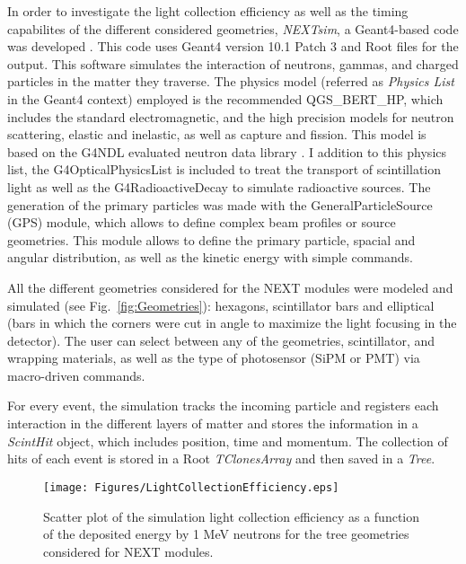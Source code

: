 In order to investigate the light collection efficiency as well as the timing capabilites of the different considered geometries, \emph{NEXTsim}, a {\sc Geant4}-based code was developed \cite{AGOSTINELLI2003250,ALLISON2016186}. This code uses  {\sc Geant4} version 10.1 Patch 3 and {\sc Root} files for the output.
This software simulates the interaction of neutrons, gammas, and charged particles in the matter they traverse. The  physics model (referred as \emph{Physics List} in the {\sc Geant4} context) employed is the recommended QGS\_BERT\_HP, which includes the standard electromagnetic, and the high precision models for neutron scattering, elastic and inelastic, as well as capture and fission.  This model is based on the G4NDL evaluated neutron data library \cite{Apostolakis2009}. I addition to this physics list, the G4OpticalPhysicsList is included to treat the transport of scintillation light as well as the G4RadioactiveDecay to simulate radioactive sources. The generation of the primary particles  was made with the GeneralParticleSource (GPS) module, which allows to define complex beam profiles or source geometries. This module allows to define the primary particle,  spacial and angular distribution, as well as the kinetic energy with simple commands.
 
 All the different geometries considered for the NEXT modules were modeled and simulated (see  Fig.~\ref{fig:Geometries}): hexagons, scintillator bars and elliptical (bars in which the corners were cut in angle to maximize the light focusing in the detector). The user can select between any of the geometries, scintillator, and wrapping materials, as well as the type of photosensor (SiPM or PMT) via macro-driven commands. 

For every event, the simulation tracks the incoming particle and registers each interaction in the different layers of matter and stores the information in a \emph{ScintHit} object, which includes position, time and momentum. The collection of hits of each event is stored in a  {\sc Root} \emph{TClonesArray} and then saved in a \emph{Tree}.

\begin{figure}[bt]
\centering
\texttt{[image: Figures/LightCollectionEfficiency.eps]}
\caption{Scatter plot of the simulation  light collection efficiency as a function of the deposited energy by 1 MeV neutrons for the tree geometries considered for NEXT modules.}
\label{fig:Efficiency}
\end{figure}

